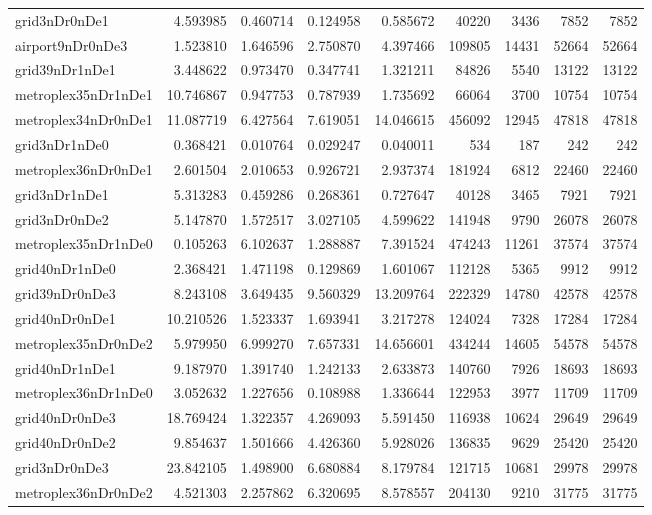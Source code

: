 \begin{longtable}{|l|r|r|r|r|r|r|r|r|}
grid3nDr0nDe1 & 4.593985 & 0.460714 & 0.124958 & 0.585672 & 40220 & 3436 & 7852 & 7852 \\
airport9nDr0nDe3 & 1.523810 & 1.646596 & 2.750870 & 4.397466 & 109805 & 14431 & 52664 & 52664 \\
grid39nDr1nDe1 & 3.448622 & 0.973470 & 0.347741 & 1.321211 & 84826 & 5540 & 13122 & 13122 \\
metroplex35nDr1nDe1 & 10.746867 & 0.947753 & 0.787939 & 1.735692 & 66064 & 3700 & 10754 & 10754 \\
metroplex34nDr0nDe1 & 11.087719 & 6.427564 & 7.619051 & 14.046615 & 456092 & 12945 & 47818 & 47818 \\
grid3nDr1nDe0 & 0.368421 & 0.010764 & 0.029247 & 0.040011 & 534 & 187 & 242 & 242 \\
metroplex36nDr0nDe1 & 2.601504 & 2.010653 & 0.926721 & 2.937374 & 181924 & 6812 & 22460 & 22460 \\
grid3nDr1nDe1 & 5.313283 & 0.459286 & 0.268361 & 0.727647 & 40128 & 3465 & 7921 & 7921 \\
grid3nDr0nDe2 & 5.147870 & 1.572517 & 3.027105 & 4.599622 & 141948 & 9790 & 26078 & 26078 \\
metroplex35nDr1nDe0 & 0.105263 & 6.102637 & 1.288887 & 7.391524 & 474243 & 11261 & 37574 & 37574 \\
grid40nDr1nDe0 & 2.368421 & 1.471198 & 0.129869 & 1.601067 & 112128 & 5365 & 9912 & 9912 \\
grid39nDr0nDe3 & 8.243108 & 3.649435 & 9.560329 & 13.209764 & 222329 & 14780 & 42578 & 42578 \\
grid40nDr0nDe1 & 10.210526 & 1.523337 & 1.693941 & 3.217278 & 124024 & 7328 & 17284 & 17284 \\
metroplex35nDr0nDe2 & 5.979950 & 6.999270 & 7.657331 & 14.656601 & 434244 & 14605 & 54578 & 54578 \\
grid40nDr1nDe1 & 9.187970 & 1.391740 & 1.242133 & 2.633873 & 140760 & 7926 & 18693 & 18693 \\
metroplex36nDr1nDe0 & 3.052632 & 1.227656 & 0.108988 & 1.336644 & 122953 & 3977 & 11709 & 11709 \\
grid40nDr0nDe3 & 18.769424 & 1.322357 & 4.269093 & 5.591450 & 116938 & 10624 & 29649 & 29649 \\
grid40nDr0nDe2 & 9.854637 & 1.501666 & 4.426360 & 5.928026 & 136835 & 9629 & 25420 & 25420 \\
grid3nDr0nDe3 & 23.842105 & 1.498900 & 6.680884 & 8.179784 & 121715 & 10681 & 29978 & 29978 \\
metroplex36nDr0nDe2 & 4.521303 & 2.257862 & 6.320695 & 8.578557 & 204130 & 9210 & 31775 & 31775 \\

\end{longtable}

